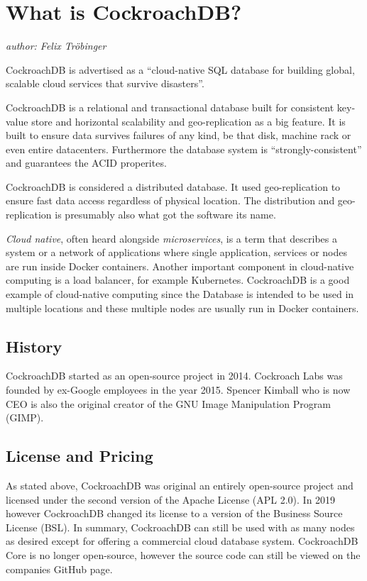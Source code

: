 \section{What is CockroachDB?}
\emph{author: Felix Tröbinger}\bigskip

CockroachDB is advertised as a \enquote{cloud-native SQL database for building global, scalable cloud services that survive disasters}\cite{cockroach-github}. 

\medskip
CockroachDB is a relational and transactional database built for consistent key-value store and horizontal scalability and geo-replication as a big feature. It is built to ensure data survives failures of any kind, be that disk, machine rack or even entire datacenters.
Furthermore the database system is \enquote{strongly-consistent} and guarantees the ACID properites.\cite{cockroach-github} 

CockroachDB is considered a distributed database. It used geo-replication to ensure fast data access regardless of physical location. The distribution and geo-replication is presumably also what got the software its name.

\medskip
\emph{Cloud native}, often heard alongside \emph{microservices}, is a term that describes a system or a network of applications where single application, services or nodes are run inside Docker containers. 
Another important component in cloud-native computing is a load balancer, for example Kubernetes. 
CockroachDB is a good example of cloud-native computing since the Database is intended to be used in multiple locations and these multiple nodes are usually run in Docker containers. 

\subsection{History}
CockroachDB started as an open-source project in 2014.
Cockroach Labs was founded by ex-Google employees in the year 2015.\cite{cockroach-wired}
Spencer Kimball who is now CEO is also the original creator of the GNU Image Manipulation Program (GIMP).

\subsection{License and Pricing}
As stated above, CockroachDB was original an entirely open-source project and licensed under the second version of the Apache License (APL 2.0).
In 2019 however CockroachDB changed its license to a version of the Business Source License (BSL).
In summary, CockroachDB can still be used with as many nodes as desired except for offering a commercial cloud database system. 
CockroachDB Core is no longer open-source, however the source code can still be viewed on the companies GitHub page.
\cite{cockroach-license}

